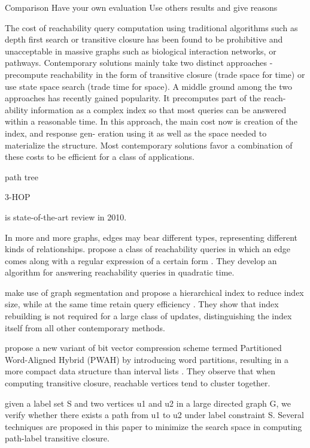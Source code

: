\documentclass[12pt, conference, compsocconf]{../IEEEtran}
\begin{document}
Comparison
Have your own evaluation
Use others results and give reasons

The cost of reachability query computation using traditional
algorithms such as depth first search or transitive closure has
been found to be prohibitive and unacceptable in massive
graphs such as biological interaction networks, or pathways.
Contemporary solutions mainly take two distinct approaches
- precompute reachability in the form of transitive closure
(trade space for time) or use state space search (trade time
for space). A middle ground among the two approaches has
recently gained popularity. It precomputes part of the reach-
ability information as a complex index so that most queries
can be answered within a reasonable time. In this approach,
the main cost now is creation of the index, and response gen-
eration using it as well as the space needed to materialize the
structure. Most contemporary solutions favor a combination
of these costs to be efficient for a class of applications.


\citep{1066} path tree

\citep{1067} 3-HOP

\citep{1063} is state-of-the-art review in 2010.

In more and more graphs, edges may bear different types, representing different kinds of relationships.  propose a class of reachability queries in which an edge comes along with a regular expression of a certain form \citep{1052}. They develop an algorithm for answering reachability queries in quadratic time.

 make use of graph segmentation and propose a hierarchical index to reduce index size, while at the same time retain query efficiency \citep{1053}. They show that index rebuilding is not required for a large class of updates, distinguishing the index itself from all other contemporary methods.

 propose a new variant of bit vector compression scheme termed Partitioned Word-Aligned Hybrid (PWAH) by introducing word partitions, resulting in a more compact data structure than interval lists \citep{1054}. They observe that when computing transitive closure, reachable vertices tend to cluster together.

\citep{1055} given a label set S and two vertices u1 and u2 in a large directed graph G, we verify whether there exists a path from u1 to u2 under label constraint S. Several techniques are proposed in this paper to minimize the search space in computing path-label transitive closure.
\end{document}
